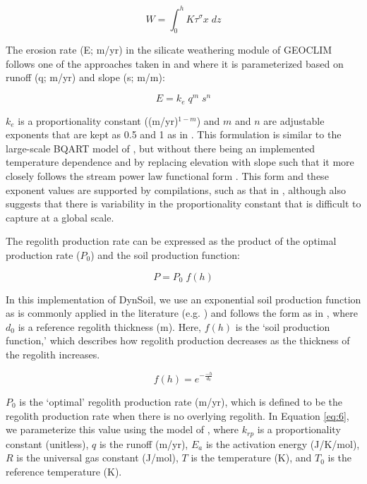 \documentclass[11pt,letterpaper]{article}
\begin{document}
\begin{equation}
    W = \int_{0}^{h} K \tau^{\sigma} x\;dz
    \label{eq:4}
\end{equation}

The erosion rate (E; m/yr) in the silicate weathering module of GEOCLIM follows one of the approaches taken in \citet{Godderis2017c} and \citet{Maffre2018a} where it is parameterized based on runoff (q; m/yr) and slope (s; m/m):

\begin{equation}
    E = k_{e}\;q^{m}\;s^{n}
    \label{eq:9}
\end{equation}

$k_{e}$ is a proportionality constant ((m/yr)$^{1-m}$) and $m$ and $n$ are adjustable exponents that are kept as 0.5 and 1 as in \citet{Maffre2018a}. This formulation is similar to the large-scale BQART model of \citet{Syvitski2007a}, but without there being an implemented temperature dependence and by replacing elevation with slope such that it more closely follows the stream power law functional form \citep{Davy2000a}. This form and these exponent values are supported by compilations, such as that in \citet{Lague2014a}, although \citet{Lague2014a} also suggests that there is variability in the proportionality constant that is difficult to capture at a global scale.

The regolith production rate can be expressed as the product of the optimal production rate ($P_{0}$) and the soil production function:

\begin{equation}
    P = P_{0}\;f(h)
    \label{eq:5}
\end{equation}

In this implementation of DynSoil, we use an exponential soil production function as is commonly applied in the literature (e.g. \citealp{Gabet2009a}) and follows the form as in \citet{Heimsath1997a}, where $d_{0}$ is a reference regolith thickness (m). Here, $f(h)$ is the `soil production function,' which describes how regolith production decreases as the thickness of the regolith increases.

\begin{equation}
    f(h) = e^{-\frac{-h}{d_{0}}}
    \label{eq:7}
\end{equation}

$P_{0}$ is the `optimal' regolith production rate (m/yr), which is defined to be the regolith production rate when there is no overlying regolith. In Equation \ref{eq:6}, we parameterize this value using the model of \citet{Carretier2014a}, where $k_{rp}$ is a proportionality constant (unitless), $q$ is the runoff (m/yr), $E_{a}$ is the activation energy (J/K/mol), $R$ is the universal gas constant (J/mol), $T$ is the temperature (K), and $T_{0}$ is the reference temperature (K).
\end{document}
